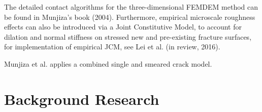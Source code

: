 \documentclass[format=acmtog, 12pt, screen=true, review=false]{acmart}
\begin{document}
The detailed contact algorithms for the three-dimensional FEMDEM method can be found in Munjiza’s book (2004). Furthermore, empirical microscale roughness effects can also be introduced via a Joint Constitutive Model, to account for dilation and normal stiffness on stressed new and pre-existing fracture surfaces, for implementation of empirical JCM, see Lei et al. (in review, 2016).

Munjiza et al. \cite{Mun99} applies a combined single and smeared crack model. 

%

\section{Background Research}




\end{document}
